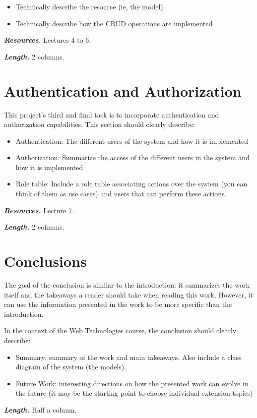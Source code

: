 \documentclass[letterpaper,twocolumn]{article}
\newcommand{\myparagraph}[1]{\vspace{0.1cm}\noindent \textbf{\textit{#1.}}}
\begin{document}
\begin{itemize}
    \item Technically describe the resource (ie, the model)
    \item Technically describe how the CRUD operations are implemented
\end{itemize}

\myparagraph{Resources} Lectures 4 to 6.

\myparagraph{Length} 2 columns.

\section{Authentication and Authorization}

This project's third and final task is to incorporate authentication and authorization capabilities.
This section should clearly describe:

\begin{itemize}
    \item Authentication: The different users of the system and how it is implemented
    \item Authorization: Summarize the access of the different users in the system and how it is implemented
    \item Role table: Include a role table associating actions over the system (you can think of them as use cases) and users that can perform these actions.
\end{itemize}

\myparagraph{Resources} Lecture 7.

\myparagraph{Length} 2 columns.

\section{Conclusions}

The goal of the conclusion is similar to the introduction: it summarizes the work itself and the takeaways a reader should take when reading this work. However, it can use the information presented in the work to be more specific than the introduction.

In the context of the Web Technologies course, the conclusion should clearly describe:

\begin{itemize}
    \item Summary: summary of the work and main takeaways. Also include a class diagram of the system (the models).
    \item Future Work: interesting directions on how the presented work can evolve in the future (it may be the starting point to choose individual extension topics)
\end{itemize}

\myparagraph{Length} Half a column.
\end{document}
